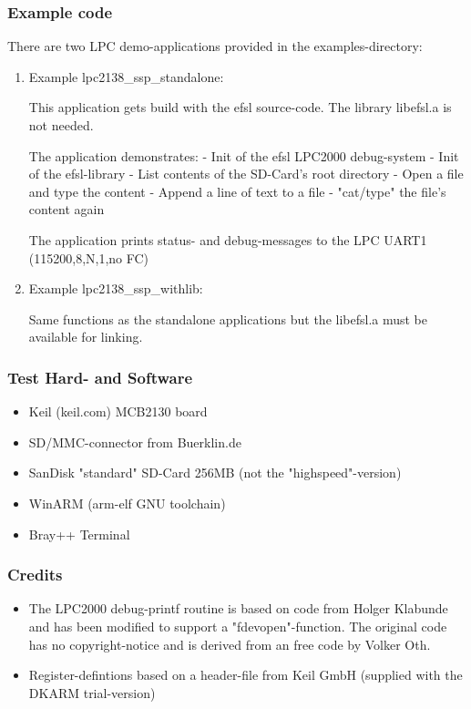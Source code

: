 \subsubsection{Example code}

There are two LPC demo-applications
provided in the examples-directory:

\begin{enumerate}
\item Example lpc2138\_ssp\_standalone:

This application gets build with
the efsl source-code. The library
libefsl.a is not needed.

The application demonstrates:
- Init of the efsl LPC2000 debug-system
- Init of the efsl-library
- List contents of the SD-Card's
  root directory
- Open a file and type the content
- Append a line of text to a file
- "cat/type" the file's content again

The application prints status- and
debug-messages to the LPC UART1
(115200,8,N,1,no FC)

\item Example lpc2138\_ssp\_withlib:

Same functions as the standalone
applications but the libefsl.a must
be available for linking.
\end{enumerate}

\subsubsection{Test Hard- and Software}
\begin{itemize}
\item Keil (keil.com) MCB2130 board
\item SD/MMC-connector from Buerklin.de
\item SanDisk "standard" SD-Card 256MB
  (not the "highspeed"-version)

\item WinARM (arm-elf GNU toolchain)
\item Bray++ Terminal
\end{itemize}

\subsubsection{Credits}
\begin{itemize}
\item The LPC2000 debug-printf routine
is based on code from Holger Klabunde
and has been modified to support
a "fdevopen"-function. The original
code has no copyright-notice and
is derived from an free code by
Volker Oth.

\item Register-defintions based on
a header-file from Keil GmbH (supplied
with the DKARM trial-version)

\end{itemize}
